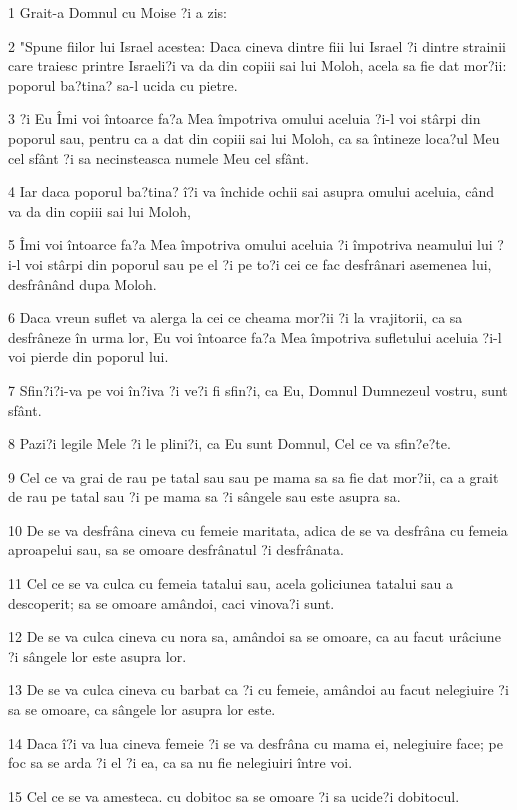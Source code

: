 \par 1 Grait-a Domnul cu Moise ?i a zis:
\par 2 "Spune fiilor lui Israel acestea: Daca cineva dintre fiii lui Israel ?i dintre strainii care traiesc printre Israeli?i va da din copiii sai lui Moloh, acela sa fie dat mor?ii: poporul ba?tina? sa-l ucida cu pietre.
\par 3 ?i Eu Îmi voi întoarce fa?a Mea împotriva omului aceluia ?i-l voi stârpi din poporul sau, pentru ca a dat din copiii sai lui Moloh, ca sa întineze loca?ul Meu cel sfânt ?i sa necinsteasca numele Meu cel sfânt.
\par 4 Iar daca poporul ba?tina? î?i va închide ochii sai asupra omului aceluia, când va da din copiii sai lui Moloh,
\par 5 Îmi voi întoarce fa?a Mea împotriva omului aceluia ?i împotriva neamului lui ?i-l voi stârpi din poporul sau pe el ?i pe to?i cei ce fac desfrânari asemenea lui, desfrânând dupa Moloh.
\par 6 Daca vreun suflet va alerga la cei ce cheama mor?ii ?i la vrajitorii, ca sa desfrâneze în urma lor, Eu voi întoarce fa?a Mea împotriva sufletului aceluia ?i-l voi pierde din poporul lui.
\par 7 Sfin?i?i-va pe voi în?iva ?i ve?i fi sfin?i, ca Eu, Domnul Dumnezeul vostru, sunt sfânt.
\par 8 Pazi?i legile Mele ?i le plini?i, ca Eu sunt Domnul, Cel ce va sfin?e?te.
\par 9 Cel ce va grai de rau pe tatal sau sau pe mama sa sa fie dat mor?ii, ca a grait de rau pe tatal sau ?i pe mama sa ?i sângele sau este asupra sa.
\par 10 De se va desfrâna cineva cu femeie maritata, adica de se va desfrâna cu femeia aproapelui sau, sa se omoare desfrânatul ?i desfrânata.
\par 11 Cel ce se va culca cu femeia tatalui sau, acela goliciunea tatalui sau a descoperit; sa se omoare amândoi, caci vinova?i sunt.
\par 12 De se va culca cineva cu nora sa, amândoi sa se omoare, ca au facut urâciune ?i sângele lor este asupra lor.
\par 13 De se va culca cineva cu barbat ca ?i cu femeie, amândoi au facut nelegiuire ?i sa se omoare, ca sângele lor asupra lor este.
\par 14 Daca î?i va lua cineva femeie ?i se va desfrâna cu mama ei, nelegiuire face; pe foc sa se arda ?i el ?i ea, ca sa nu fie nelegiuiri între voi.
\par 15 Cel ce se va amesteca. cu dobitoc sa se omoare ?i sa ucide?i dobitocul.
